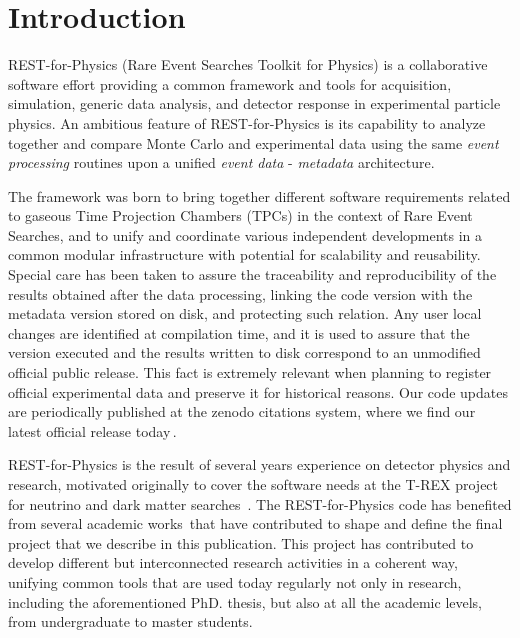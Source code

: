 \section{Introduction}
\label{sec:intro}



REST-for-Physics (Rare Event Searches Toolkit for Physics) is a collaborative software effort providing a common framework and tools for acquisition, simulation, generic data analysis, and detector response in experimental particle physics. An ambitious feature of REST-for-Physics is its capability to analyze together and compare Monte Carlo and experimental data using the same \emph{event processing} routines upon a unified \emph{event data} - \emph{metadata} architecture. 

The framework was born to bring together different software requirements related to gaseous Time Projection Chambers (TPCs) in the context of Rare Event Searches, and to unify and coordinate various independent developments in a common modular infrastructure with potential for scalability and reusability. Special care has been taken to assure the traceability and reproducibility of the results obtained after the data processing, linking the code version with the metadata version stored on disk, and protecting such relation. Any user local changes are identified at compilation time, and it is used to assure that the version executed and the results written to disk correspond to an unmodified official public release. This fact is extremely relevant when planning to register official experimental data and preserve it for historical reasons. Our code updates are periodically published at the zenodo citations system, where we find our latest official release today\,\cite{javier_galan_2021_5092550}.

REST-for-Physics is the result of several years experience on detector physics and research, motivated originally to cover the software needs at the T-REX project for neutrino and dark matter searches~\cite{Irastorza:2015dcb,Irastorza:2015geo}. The REST-for-Physics code has benefited from several academic works\,\cite{IguazThesis,tomas2013development,SeguiThesis,HerreraThesis,GraciaThesis, GarciaPascualThesis, RuizThesis} that have contributed to shape and define the final project that we describe in this publication.
This project has contributed to develop different but interconnected research activities in a coherent way, unifying common tools that are used today regularly not only in research, including the aforementioned PhD. thesis, but also at all the academic levels, from undergraduate to master students. 

